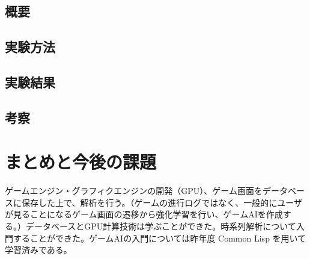 \documentclass{scrartcl}
\begin{document}
\subsection{概要}
\label{sec:orgcd18463}
\subsection{実験方法}
\label{sec:org4dde3fa}
\subsection{実験結果}
\label{sec:org3bcfd49}
\subsection{考察}
\label{sec:orga9c1649}
\section{まとめと今後の課題}
\label{sec:org5b63f11}
ゲームエンジン・グラフィクエンジンの開発（GPU）、ゲーム画面をデータベースに保存した上で、解析を行う。（ゲームの進行ログではなく、一般的にユーザが見ることになるゲーム画面の遷移から強化学習を行い、ゲームAIを作成する。）データベースとGPU計算技術は学ぶことができた。時系列解析について入門することができた。ゲームAIの入門については昨年度 Common Lisp を用いて学習済みである。\\
\printbibliography\\
\end{document}
